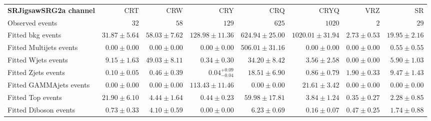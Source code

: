 

\begin{table}
\begin{center}
\setlength{\tabcolsep}{0.0pc}
{\tiny
\begin{tabular*}{\textwidth}{@{\extracolsep{\fill}}lrrrrrrr}
\noalign{\smallskip}\hline\noalign{\smallskip}
{\bf SRJigsawSRG2a channel}           & CRT            & CRW            & CRY            & CRQ            & CRYQ            & VRZ            & SR              \\[-0.05cm]
\noalign{\smallskip}\hline\noalign{\smallskip}
Observed events          & $32$              & $58$              & $129$              & $625$              & $1020$              & $2$              & $29$                    \\
\noalign{\smallskip}\hline\noalign{\smallskip}
Fitted bkg events         & $31.87 \pm 5.64$          & $58.03 \pm 7.62$          & $128.98 \pm 11.36$          & $624.94 \pm 25.00$          & $1020.01 \pm 31.94$          & $2.73 \pm 0.53$          & $19.95 \pm 2.16$              \\
\noalign{\smallskip}\hline\noalign{\smallskip}
        Fitted Multijets events         & $0.00 \pm 0.00$          & $0.00 \pm 0.00$          & $0.00 \pm 0.00$          & $506.01 \pm 31.16$          & $0.00 \pm 0.00$          & $0.00 \pm 0.00$          & $0.55 \pm 0.55$              \\
        Fitted Wjets events         & $9.15 \pm 1.63$          & $49.03 \pm 8.11$          & $0.34 \pm 0.30$          & $34.20 \pm 8.42$          & $3.56 \pm 2.58$          & $0.00 \pm 0.00$          & $5.90 \pm 1.03$              \\
        Fitted Zjets events         & $0.10 \pm 0.05$          & $0.46 \pm 0.39$          & $0.04_{-0.04}^{+0.09}$          & $18.51 \pm 6.90$          & $0.86 \pm 0.79$          & $1.90 \pm 0.33$          & $9.47 \pm 1.43$              \\
        Fitted GAMMAjets events         & $0.00 \pm 0.00$          & $0.00 \pm 0.00$          & $113.43 \pm 11.46$          & $0.00 \pm 0.00$          & $21.61 \pm 3.42$          & $0.00 \pm 0.00$          & $0.00 \pm 0.00$              \\
        Fitted Top events         & $21.90 \pm 6.10$          & $4.44 \pm 1.64$          & $0.44 \pm 0.23$          & $59.98 \pm 17.81$          & $3.84 \pm 1.24$          & $0.35 \pm 0.27$          & $2.28 \pm 0.85$              \\
        Fitted Diboson events         & $0.73 \pm 0.33$          & $4.10 \pm 0.59$          & $0.00 \pm 0.00$          & $6.23 \pm 0.69$          & $0.16 \pm 0.07$          & $0.47 \pm 0.25$          & $1.74 \pm 0.88$              \\

\end{tabular*}}
\end{center}
\end{table}
